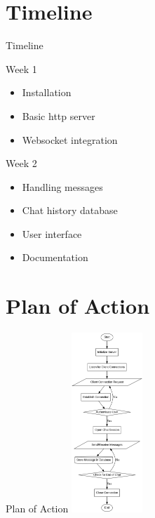 \documentclass{beamer}
\begin{document}
\section{Timeline}
\begin{frame}{Timeline}
    \begin{block}{Week 1}
        \begin{itemize}
            \item Installation
            \item Basic http server
            \item Websocket integration
        \end{itemize}
    \end{block}
    
    \begin{block}{Week 2}
        \begin{itemize}
            \item Handling messages
            \item Chat history database
            \item User interface
            \item Documentation
        \end{itemize}
    \end{block}
\end{frame}

\section{Plan of Action}
\begin{frame}{Plan of Action}
    \centering
    \includegraphics[width=0.2\textwidth]{graph.png}
\end{frame}
\end{document}
